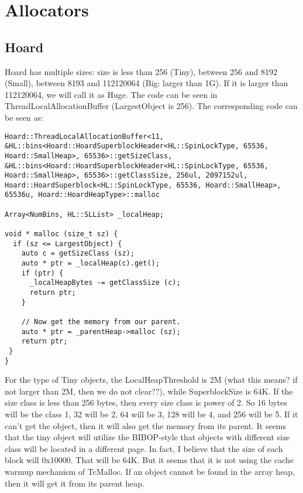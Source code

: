 \section{Allocators}

\subsection{Hoard}

Hoard has multiple sizes: size is less than 256 (Tiny), between 256 and 8192 (Small), between 8193 and 112120064 (Big: larger than 1G). If it is larger than 112120064, we will call it as Huge. 
The code can be seen in ThreadLocalAllocationBuffer (LargestObject is 256). The corresponding code can be seen as: 
\begin{lstlisting}
Hoard::ThreadLocalAllocationBuffer<11, &HL::bins<Hoard::HoardSuperblockHeader<HL::SpinLockType, 65536, Hoard::SmallHeap>, 65536>::getSizeClass, &HL::bins<Hoard::HoardSuperblockHeader<HL::SpinLockType, 65536, Hoard::SmallHeap>, 65536>::getClassSize, 256ul, 2097152ul, Hoard::HoardSuperblock<HL::SpinLockType, 65536, Hoard::SmallHeap>, 65536u, Hoard::HoardHeapType>::malloc

Array<NumBins, HL::SLList> _localHeap;

void * malloc (size_t sz) {
  if (sz <= LargestObject) {
    auto c = getSizeClass (sz);
    auto * ptr = _localHeap(c).get();
    if (ptr) {
      _localHeapBytes -= getClassSize (c);         
      return ptr;
    }

    // Now get the memory from our parent.
    auto * ptr = _parentHeap->malloc (sz);
    return ptr;	
 }
}
\end{lstlisting}

For the type of Tiny objects, the LocalHeapThreshold is 2M (what this means? if not larger than 2M, then we do not clear??), while SuperblockSize is 64K. If the size class is less than 256 bytes, then every size class is power of 2. So 16 bytes will be the class 1, 32 will be 2, 64 will be 3, 128 will be 4, and 256 will be 5. If it can't get the object, then it will also get the memory from its parent. It seems that the tiny object will utilize the BIBOP-style that objects with different size class will be located in a different page. In fact, I believe that the size of each block will 0x10000. That will be 64K. But it seems that it is not using the cache warmup mechanism of TcMalloc. If an object cannot be found in the array heap, then it will get it from its parent heap. 


